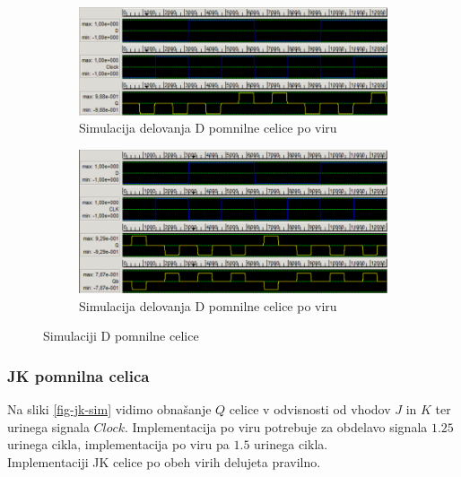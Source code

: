 \documentclass[a4paper, 11pt]{article}
\begin{document}
\begin{figure}[h!]
	\begin{subfigure}[b]{\textwidth}
	\includegraphics[width=\textwidth]{../img/vir_4/sim_d.png}
	\caption{Simulacija delovanja D pomnilne celice po viru \cite{quantum_dot}}
	\label{fig-d-1-sim}
	\end{subfigure}
	\begin{subfigure}[b]{\textwidth}
	\includegraphics[width=\textwidth]{../img/vir_5/sim_d.png}
	\caption{Simulacija delovanja D pomnilne celice po viru \cite{a_novel_approach}}
	\label{fig-d-2-sim}
	\end{subfigure}
	\caption{Simulaciji D pomnilne celice}
	\label{fig-d-sim}
\end{figure}

\subsubsection{JK pomnilna celica}
Na sliki \ref{fig-jk-sim} vidimo obnašanje $Q$ celice v odvisnosti od vhodov $J$ in $K$ ter urinega signala $Clock$.
Implementacija po viru \cite{quantum_dot} potrebuje za obdelavo signala $1.25$ urinega cikla, implementacija po viru \cite{a_novel_approach} pa $1.5$ urinega cikla.\\
Implementaciji JK celice po obeh virih delujeta pravilno.
\end{document}
